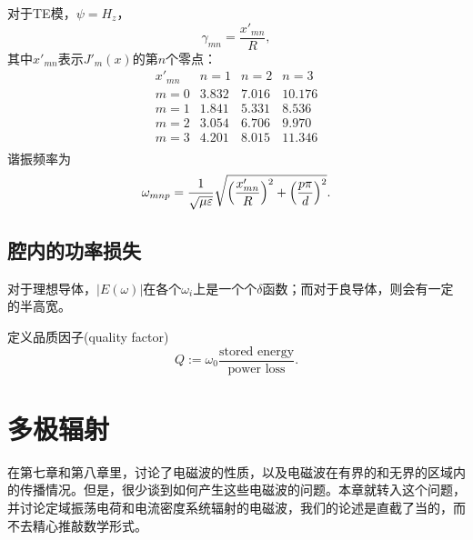 对于TE模，$\psi=H_z$，
\[
    \gamma_{mn}=\frac{x'_{mn}}R,
\]
其中$x'_{mn}$表示$J'_m(x)$的第$n$个零点：
\begin{equation}
    \begin{matrix}
        x'_{mn}&n=1&n=2&n=3\\
        m=0&3.832&7.016&10.176\\
        m=1&1.841&5.331& 8.536\\
        m=2&3.054&6.706& 9.970\\
        m=3&4.201&8.015&11.346\\
    \end{matrix}
\end{equation}
谐振频率为
\begin{equation}
    \omega_{mnp}=\frac1{\sqrt{\mu\varepsilon}}\sqrt{\Bigl(\frac{x'_{mn}}R\Bigr)^2+\Bigl(\frac{p\pi}d\Bigr)^2}.
\end{equation}
\subsection{腔内的功率损失}
对于理想导体，$|E(\omega)|$在各个$\omega_i$上是一个个$\delta$函数；而对于良导体，则会有一定的半高宽。

定义品质因子(quality factor)
\begin{equation}
    Q:=\omega_0\frac{\text{stored energy}}{\text{power loss}}.
\end{equation}
\clearpage
\section{多极辐射}
\label{sec:multipole radiation}
在第七章和第八章里，讨论了电磁波的性质，以及电磁波在有界的和无界的区域内的传播情况。但是，很少谈到如何产生这些电磁波的问题。本章就转入这个问题，并讨论定域振荡电荷和电流密度系统辐射的电磁波，我们的论述是直截了当的，而不去精心推敲数学形式。%

